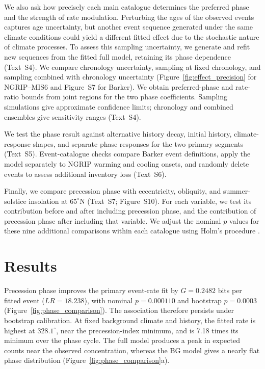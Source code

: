 \documentclass[11pt]{article}
\begin{document}
We also ask how precisely each main catalogue determines the preferred phase and the strength of rate modulation. Perturbing the ages of the observed events captures age uncertainty, but another event sequence generated under the same climate conditions could yield a different fitted effect due to the stochastic nature of climate processes. To assess this sampling uncertainty, we generate and refit new sequences from the fitted full model, retaining its phase dependence (Text~S4). We compare chronology uncertainty, sampling at fixed chronology, and sampling combined with chronology uncertainty (Figure~\ref{fig:effect_precision} for NGRIP--MIS6 and Figure~S7 for Barker). We obtain preferred-phase and rate-ratio bounds from joint regions for the two phase coefficients. Sampling simulations give approximate confidence limits; chronology and combined ensembles give sensitivity ranges (Text~S4).

We test the phase result against alternative history decay, initial history, climate-response shapes, and separate phase responses for the two primary segments (Text~S5). Event-catalogue checks compare Barker event definitions, apply the model separately to NGRIP warming and cooling onsets, and randomly delete events to assess additional inventory loss (Text~S6).

Finally, we compare precession phase with eccentricity, obliquity, and summer-solstice insolation at $65^\circ$N (Text~S7; Figure~S10). For each variable, we test its contribution before and after including precession phase, and the contribution of precession phase after including that variable. We adjust the nominal $p$ values for these nine additional comparisons within each catalogue using Holm's procedure \citep{holm1979simple}.

\section{Results}
Precession phase improves the primary event-rate fit by $G=0.2482$ bits per fitted event ($LR=18.238$), with nominal $p=0.000110$ and bootstrap $p=0.0003$ (Figure~\ref{fig:phase_comparison}). The association therefore persists under bootstrap calibration. At fixed background climate and history, the fitted rate is highest at $328.1^\circ$, near the precession-index minimum, and is 7.18 times its minimum over the phase cycle. The full model produces a peak in expected counts near the observed concentration, whereas the BG model gives a nearly flat phase distribution (Figure~\ref{fig:phase_comparison}a).
\end{document}
